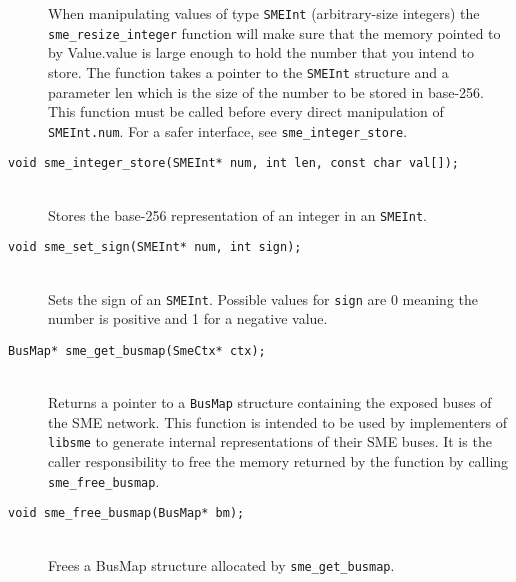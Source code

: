 \begin{description}
   When manipulating values of type {\tt SMEInt} (arbitrary-size integers) the
   \texttt{sme_resize_integer} function will make sure that the memory pointed
   to by Value.value is large enough to hold the number that you intend to
   store. The function takes a pointer to the {\tt SMEInt} structure and a
   parameter len which is the size of the number to be stored in base-256. This
   function must be called before every direct manipulation of {\tt
     SMEInt.num}. For a safer interface, see \texttt{sme_integer_store}.
 \item[\texttt{void sme_integer_store(SMEInt* num, int len, const char val[]);}]\hfill\\
   Stores the base-256 representation of an integer in an \texttt{SMEInt}.
 \item[\texttt{void sme_set_sign(SMEInt* num, int sign);}]\hfill\\
   Sets the sign of an \texttt{SMEInt}. Possible values for \texttt{sign} are 0
   meaning the number is positive and 1 for a negative value.
 \item[\texttt{BusMap* sme_get_busmap(SmeCtx* ctx);}]\hfill\\
   Returns a pointer to a {\tt BusMap} structure containing the exposed buses of
   the SME network. This function is intended to be used by implementers of {\tt
     libsme} to generate internal representations of their SME buses. It is the
   caller responsibility to free the memory returned by the function by calling
   \texttt{sme_free_busmap}.
\item[\texttt{void sme_free_busmap(BusMap* bm);}]\hfill\\
   Frees a BusMap structure allocated by \texttt{sme_get_busmap}.
\end{description}

